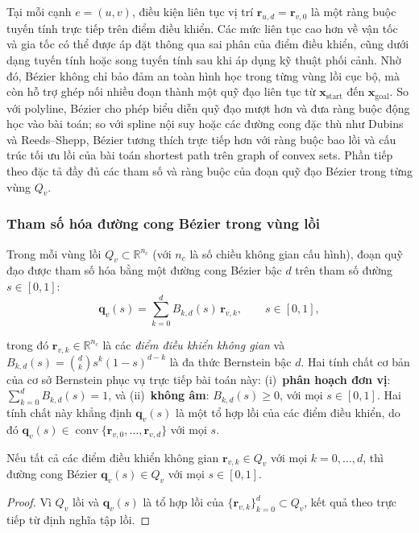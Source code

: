 Tại mỗi cạnh $e = (u,v)$, điều kiện liên tục vị trí $\mathbf{r}_{u,d} = \mathbf{r}_{v,0}$
là một ràng buộc tuyến tính trực tiếp trên điểm điều khiển.
Các mức liên tục cao hơn về vận tốc và gia tốc có thể được áp đặt thông qua sai phân
của điểm điều khiển, cũng dưới dạng tuyến tính hoặc song tuyến tính sau khi áp dụng
kỹ thuật phối cảnh.
Nhờ đó, Bézier không chỉ bảo đảm an toàn hình học trong từng vùng lồi cục bộ, mà còn
hỗ trợ ghép nối nhiều đoạn thành một quỹ đạo liên tục từ $\mathbf{x}_{\mathrm{start}}$
đến $\mathbf{x}_{\mathrm{goal}}$.
So với polyline, Bézier cho phép biểu diễn quỹ đạo mượt hơn và đưa ràng buộc động học
vào bài toán; so với spline nội suy hoặc các đường cong đặc thù như Dubins và
Reeds--Shepp, Bézier tương thích trực tiếp hơn với ràng buộc bao lồi và cấu trúc tối
ưu lồi của bài toán shortest path trên graph of convex sets.
Phần tiếp theo đặc tả đầy đủ các tham số và ràng buộc của đoạn quỹ đạo Bézier trong
từng vùng $Q_v$.

\subsubsection{Tham số hóa đường cong Bézier trong vùng lồi}
\label{subsubsec:bezier_param}

Trong mỗi vùng lồi $Q_v \subset \mathbb{R}^{n_c}$ (với $n_c$ là số chiều không
gian cấu hình), đoạn quỹ đạo được tham số hóa bằng một đường cong Bézier bậc
$d$ trên tham số đường $s \in [0,1]$:
\begin{equation}
    \mathbf{q}_v(s)
    = \sum_{k=0}^{d} B_{k,d}(s)\, \mathbf{r}_{v,k},
    \qquad s \in [0,1],
    \label{eq:bezier_curve}
\end{equation}

trong đó $\mathbf{r}_{v,k} \in \mathbb{R}^{n_c}$ là các \emph{điểm điều khiển không gian} và $B_{k,d}(s) = \binom{d}{k} s^k (1-s)^{d-k}$ là đa thức Bernstein
bậc $d$. Hai tính chất cơ bản của cơ sở Bernstein phục vụ trực tiếp bài toán này:
(i)~\textbf{phân hoạch đơn vị}: $\sum_{k=0}^{d} B_{k,d}(s) = 1$, và
(ii)~\textbf{không âm}: $B_{k,d}(s) \ge 0$, với mọi $s \in [0,1]$.
Hai tính chất này khẳng định $\mathbf{q}_v(s)$ là một tổ hợp lồi của các điểm
điều khiển, do đó $\mathbf{q}_v(s) \in \operatorname{conv}\{\mathbf{r}_{v,0},
    \ldots, \mathbf{r}_{v,d}\}$ với mọi $s$.

\begin{proposition}
    \label{prop:bezier_safety}
    Nếu tất cả các điểm điều khiển không gian $\mathbf{r}_{v,k} \in Q_v$ với mọi
    $k = 0, \ldots, d$, thì đường cong Bézier $\mathbf{q}_v(s) \in Q_v$ với mọi
    $s \in [0,1]$.
\end{proposition}
\begin{proof}
    Vì $Q_v$ lồi và $\mathbf{q}_v(s)$ là tổ hợp lồi của $\{\mathbf{r}_{v,k}\}_{k=0}^d
        \subset Q_v$, kết quả theo trực tiếp từ định nghĩa tập lồi.
\end{proof}

